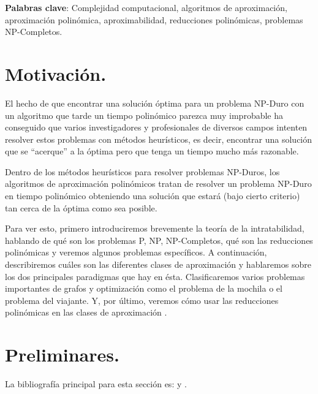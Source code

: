 \documentclass[a4paper,12pt,titlepage]{article}
\begin{document}
\vspace{2cm}
{\bf Palabras clave}: Complejidad computacional, algoritmos de aproximaci\'on, aproximaci\'on polin\'omica, aproximabilidad, reducciones polin\'omicas, problemas NP-Completos.

\newpage

\tableofcontents

\newpage

\section{Motivaci\'on.}\label{sec:motivacion}

El hecho de que encontrar una soluci\'on \'optima para un problema NP-Duro con un algoritmo que tarde un tiempo polin\'omico parezca muy improbable ha conseguido que varios investigadores y profesionales de diversos campos intenten resolver estos problemas con m\'etodos heur\'isticos, es decir, encontrar una soluci\'on que se ``acerque'' a la \'optima pero que tenga un tiempo mucho m\'as razonable.

Dentro de los m\'etodos heur\'isticos para resolver problemas NP-Duros, los algoritmos de aproximaci\'on polin\'omicos tratan de resolver un problema NP-Duro en tiempo polin\'omico obteniendo una soluci\'on que estar\'a (bajo cierto criterio) tan cerca de la \'optima como sea posible.

Para ver esto, primero introduciremos brevemente la teor\'ia de la intratabilidad, hablando de qu\'e son los problemas P, NP, NP-Completos, qu\'e son las reducciones polin\'omicas y veremos algunos problemas espec\'ificos. A continuaci\'on, describiremos cu\'ales son las diferentes clases de aproximaci\'on y hablaremos sobre los dos principales paradigmas que hay en \'esta. Clasificaremos varios problemas importantes de grafos y optimizaci\'on como el problema de la mochila o el problema del viajante. Y, por \'ultimo, veremos c\'omo usar las reducciones polin\'omicas en las clases de aproximaci\'on \cite{approx_core}.

\newpage

\section{Preliminares.}
\label{sec:preliminares}

La bibliograf\'ia principal para esta secci\'on es: \cite{AroraBarak} y \cite{HopcroftESP}.

\vspace{0.3cm}
\end{document}
